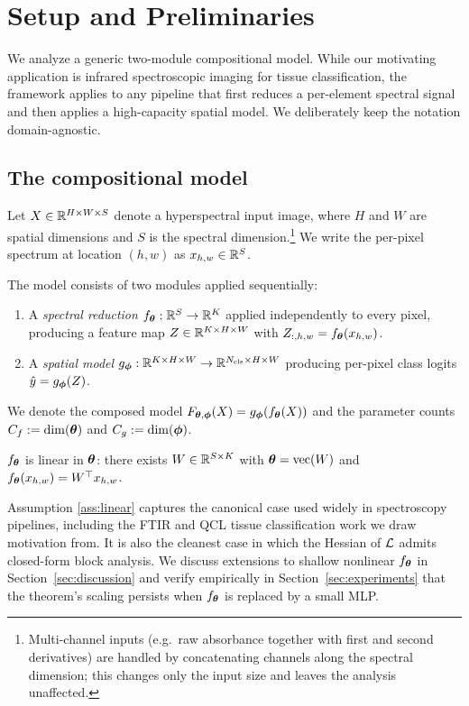 \section{Setup and Preliminaries}
\label{sec:setup}

We analyze a generic two-module compositional model. While our motivating
application is infrared spectroscopic imaging for tissue classification,
the framework applies to any pipeline that first reduces a per-element
spectral signal and then applies a high-capacity spatial model. We
deliberately keep the notation domain-agnostic.

\subsection{The compositional model}

Let $X \in \mathbb{R}^{H \times W \times S}$ denote a hyperspectral input image,
where $H$ and $W$ are spatial dimensions and $S$ is the spectral
dimension.\footnote{Multi-channel inputs (e.g.\ raw absorbance together
with first and second derivatives) are handled by concatenating channels
along the spectral dimension; this changes only the input size and
leaves the analysis unaffected.} We write the per-pixel spectrum at
location $(h,w)$ as $x_{h,w} \in \mathbb{R}^S$.

The model consists of two modules applied sequentially:
\begin{enumerate}
    \item A \emph{spectral reduction} $f_{\boldsymbol{\theta}}: \mathbb{R}^S \to \mathbb{R}^K$
          applied independently to every pixel, producing a feature map
          $Z \in \mathbb{R}^{K \times H \times W}$ with
          $Z_{:,h,w} = f_{\boldsymbol{\theta}}(x_{h,w})$.
    \item A \emph{spatial model} $g_{\boldsymbol{\phi}}: \mathbb{R}^{K \times H \times W} \to
          \mathbb{R}^{N_{\mathrm{cls}} \times H \times W}$ producing per-pixel
          class logits $\hat{y} = g_{\boldsymbol{\phi}}(Z)$.
\end{enumerate}
We denote the composed model
$F_{{\boldsymbol{\theta}},{\boldsymbol{\phi}}}(X) = g_{\boldsymbol{\phi}}(f_{\boldsymbol{\theta}}(X))$ and the parameter counts
$C_f := \dim({\boldsymbol{\theta}})$ and $C_g := \dim({\boldsymbol{\phi}})$.

\begin{assumption}
\label{ass:linear}
$f_{\boldsymbol{\theta}}$ is linear in ${\boldsymbol{\theta}}$: there exists $W \in \mathbb{R}^{S \times K}$
with ${\boldsymbol{\theta}} = \mathrm{vec}(W)$ and $f_{\boldsymbol{\theta}}(x_{h,w}) = W^\top x_{h,w}$.
\end{assumption}

\begin{remark}
Assumption \ref{ass:linear} captures the canonical case used widely in
spectroscopy pipelines, including the FTIR and QCL tissue
classification work we draw motivation from. It is also the cleanest
case in which the Hessian of $\mathcal{L}$ admits closed-form block analysis.
We discuss extensions to shallow nonlinear $f_{\boldsymbol{\theta}}$ in
Section~\ref{sec:discussion} and verify empirically in
Section~\ref{sec:experiments} that the theorem's scaling persists when
$f_{\boldsymbol{\theta}}$ is replaced by a small MLP.
\end{remark}

